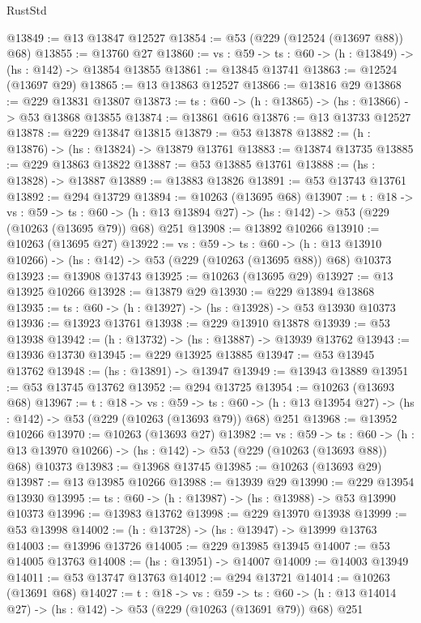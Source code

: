 \begin{lexlean}{RustStd}
\begin{coremodule}
@13849 := @13 @13847 @12527
@13854 := @53 (@229 (@12524 (@13697 @88)) @68)
@13855 := @13760 @27
@13860 := {vs : @59} -> {ts : @60} -> (h : @13849) -> (hs : @142) -> @13854 @13855
@13861 := @13845 @13741
@13863 := @12524 (@13697 @29)
@13865 := @13 @13863 @12527
@13866 := @13816 @29
@13868 := @229 @13831 @13807
@13873 := {ts : @60} -> (h : @13865) -> (hs : @13866) -> @53 @13868 @13855
@13874 := @13861 @616
@13876 := @13 @13733 @12527
@13878 := @229 @13847 @13815
@13879 := @53 @13878
@13882 := (h : @13876) -> (hs : @13824) -> @13879 @13761
@13883 := @13874 @13735
@13885 := @229 @13863 @13822
@13887 := @53 @13885 @13761
@13888 := (hs : @13828) -> @13887
@13889 := @13883 @13826
@13891 := @53 @13743 @13761
@13892 := @294 @13729
@13894 := @10263 (@13695 @68)
@13907 := {t : @18} ->
  {vs : @59} ->
  {ts : @60} -> (h : @13 @13894 @27) -> (hs : @142) -> @53 (@229 (@10263 (@13695 @79)) @68) @251
@13908 := @13892 @10266
@13910 := @10263 (@13695 @27)
@13922 := {vs : @59} ->
  {ts : @60} ->
  (h : @13 @13910 @10266) -> (hs : @142) -> @53 (@229 (@10263 (@13695 @88)) @68) @10373
@13923 := @13908 @13743
@13925 := @10263 (@13695 @29)
@13927 := @13 @13925 @10266
@13928 := @13879 @29
@13930 := @229 @13894 @13868
@13935 := {ts : @60} -> (h : @13927) -> (hs : @13928) -> @53 @13930 @10373
@13936 := @13923 @13761
@13938 := @229 @13910 @13878
@13939 := @53 @13938
@13942 := (h : @13732) -> (hs : @13887) -> @13939 @13762
@13943 := @13936 @13730
@13945 := @229 @13925 @13885
@13947 := @53 @13945 @13762
@13948 := (hs : @13891) -> @13947
@13949 := @13943 @13889
@13951 := @53 @13745 @13762
@13952 := @294 @13725
@13954 := @10263 (@13693 @68)
@13967 := {t : @18} ->
  {vs : @59} ->
  {ts : @60} -> (h : @13 @13954 @27) -> (hs : @142) -> @53 (@229 (@10263 (@13693 @79)) @68) @251
@13968 := @13952 @10266
@13970 := @10263 (@13693 @27)
@13982 := {vs : @59} ->
  {ts : @60} ->
  (h : @13 @13970 @10266) -> (hs : @142) -> @53 (@229 (@10263 (@13693 @88)) @68) @10373
@13983 := @13968 @13745
@13985 := @10263 (@13693 @29)
@13987 := @13 @13985 @10266
@13988 := @13939 @29
@13990 := @229 @13954 @13930
@13995 := {ts : @60} -> (h : @13987) -> (hs : @13988) -> @53 @13990 @10373
@13996 := @13983 @13762
@13998 := @229 @13970 @13938
@13999 := @53 @13998
@14002 := (h : @13728) -> (hs : @13947) -> @13999 @13763
@14003 := @13996 @13726
@14005 := @229 @13985 @13945
@14007 := @53 @14005 @13763
@14008 := (hs : @13951) -> @14007
@14009 := @14003 @13949
@14011 := @53 @13747 @13763
@14012 := @294 @13721
@14014 := @10263 (@13691 @68)
@14027 := {t : @18} ->
  {vs : @59} ->
  {ts : @60} -> (h : @13 @14014 @27) -> (hs : @142) -> @53 (@229 (@10263 (@13691 @79)) @68) @251

\end{coremodule}
\end{lexlean}
